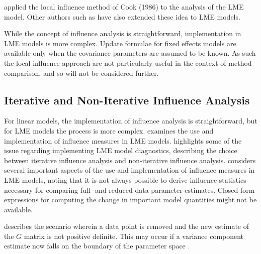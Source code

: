 \documentclass[12pt, a4paper]{report}
\theoremstyle{definition}
\theoremstyle{remark}
\begin{document}
\citet{Beckman} applied the local influence method of Cook (1986) to the analysis of the LME model.  Other authors such as \citet{lesaffre1998local} have also extended these idea to LME models. 


While the concept of influence analysis is straightforward, implementation in LME models is more complex. Update formulae for fixed effects models are available only when the covariance parameters are assumed to be known. As such the local influence approach are not particularly useful in the context of method comparison, and so will not be considered further.





                                                       

 \subsection{Iterative and Non-Iterative Influence Analysis}

                                                                                                                                                  

For linear models, the implementation of influence analysis is straightforward, but for LME models the process is more complex. \citet{schabenberger} examines the use and implementation of
influence measures in LME models. \citet{schabenberger} highlights some of the issue regarding implementing LME model diagnostics, describing  the choice between  iterative influence analysis and  non-iterative influence analysis.
\citet{schabenberger} considers several important aspects of the use and implementation of influence measures in LME models, noting that it is not always possible to
derive influence statistics necessary for comparing full- and reduced-data parameter estimates. Closed-form expressions for computing the change in important model quantities might not be available.

\citet{schabenberger} describes the scenario wherein a data point is removed and the new estimate of the $G$ matrix is not positive definite. This may occur if a variance component
estimate now falls on the boundary of the parameter space \citep{schabenberger}. 
                                                                                                                                                                                                                                                                                               
\end{document}
